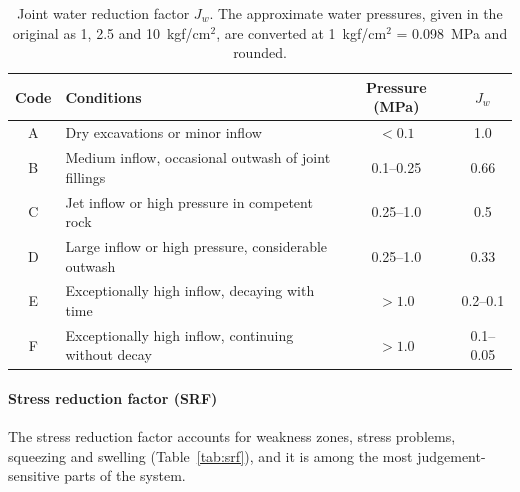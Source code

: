 \begin{table}[htbp]
\caption{Joint water reduction factor \(J_w\). The approximate water
pressures, given in the original as 1, 2.5 and 10~kgf/cm\(^2\), are converted
at 1~kgf/cm\(^2\) = 0.098~MPa and rounded.}
\label{tab:jw}
\centering
\small
\begin{tabularx}{\textwidth}{c Y c c}
\toprule
\textbf{Code} & \textbf{Conditions} & \textbf{Pressure (MPa)} & \textbf{\(J_w\)} \\
\midrule
A & Dry excavations or minor inflow & \(<0.1\) & 1.0 \\
B & Medium inflow, occasional outwash of joint fillings & 0.1--0.25 & 0.66 \\
C & Jet inflow or high pressure in competent rock & 0.25--1.0 & 0.5 \\
D & Large inflow or high pressure, considerable outwash & 0.25--1.0 & 0.33 \\
E & Exceptionally high inflow, decaying with time & \(>1.0\) & 0.2--0.1 \\
F & Exceptionally high inflow, continuing without decay & \(>1.0\) & 0.1--0.05 \\
\bottomrule
\end{tabularx}
\end{table}

\paragraph{Stress reduction factor (SRF)}
\label{sec:srf}
The stress reduction factor accounts for weakness zones, stress problems,
squeezing and swelling (Table~\ref{tab:srf}), and it is among the most
judgement-sensitive parts of the system.

